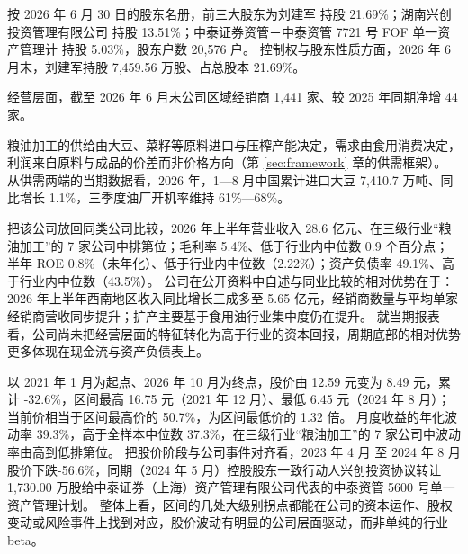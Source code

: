  按 2026 年 6 月 30 日的股东名册，前三大股东为刘建军 持股 21.69\%；湖南兴创投资管理有限公司 持股 13.51\%；中泰证券资管－中泰资管 7721 号 FOF 单一资产管理计 持股 5.03\%，股东户数 20,576 户。 控制权与股东性质方面，2026 年 6 月末，刘建军持股 7,459.56 万股、占总股本 21.69\%。

 经营层面，截至 2026 年 6 月末公司区域经销商 1,441 家、较 2025 年同期净增 44 家。

 粮油加工的供给由大豆、菜籽等原料进口与压榨产能决定，需求由食用消费决定，利润来自原料与成品的价差而非价格方向（第 \ref{sec:framework} 章的供需框架）。 从供需两端的当期数据看，2026 年，1—8 月中国累计进口大豆 7,410.7 万吨、同比增长 1.1\%，三季度油厂开机率维持 61\%—68\%。

 把该公司放回同类公司比较，2026 年上半年营业收入 28.6 亿元、在三级行业“粮油加工”的 7 家公司中排第位；毛利率 5.4\%、低于行业内中位数 0.9 个百分点；半年 ROE 0.8\%（未年化）、低于行业内中位数（2.22\%）；资产负债率 49.1\%、高于行业内中位数（43.5\%）。 公司在公开资料中自述与同业比较的相对优势在于：2026 年上半年西南地区收入同比增长三成多至 5.65 亿元，经销商数量与平均单家经销商营收同步提升；扩产主要基于食用油行业集中度仍在提升。 就当期报表看，公司尚未把经营层面的特征转化为高于行业的资本回报，周期底部的相对优势更多体现在现金流与资产负债表上。

 以 2021 年 1 月为起点、2026 年 10 月为终点，股价由 12.59 元变为 8.49 元，累计 -32.6\%，区间最高 16.75 元（2021 年 12 月）、最低 6.45 元（2024 年 8 月）；当前价相当于区间最高价的 50.7\%，为区间最低价的 1.32 倍。 月度收益的年化波动率 39.3\%，高于全样本中位数 37.3\%，在三级行业“粮油加工”的 7 家公司中波动率由高到低排第位。 把股价阶段与公司事件对齐看，2023 年 4 月 至 2024 年 8 月股价下跌-56.6\%，同期（2024 年 5 月）控股股东一致行动人兴创投资协议转让 1,730.00 万股给中泰证券（上海）资产管理有限公司代表的中泰资管 5600 号单一资产管理计划。 整体上看，区间的几处大级别拐点都能在公司的资本运作、股权变动或风险事件上找到对应，股价波动有明显的公司层面驱动，而非单纯的行业 beta。

